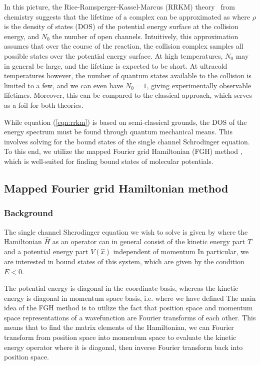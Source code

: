 \documentclass[%
 reprint,
 amsmath,amssymb,
 aps,
 nofootinbib
]{revtex4-1}
\begin{document}
In this picture, the Rice-Ramsperger-Kassel-Marcus (RRKM) theory~\cite{marcus1952-1,marcus1952-2} from chemistry suggests that the lifetime of a complex can be approximated as 
where $\rho$ is the density of states (DOS) of the potential energy surface at the collision energy, and $N_0$ the number of open channels. Intuitively, this approximation assumes that over the course of the reaction, the collision complex samples all possible states over the potential energy surface. At high temperatures, $N_0$ may in general be large, and the lifetime is expected to be short. At ultracold temperatures however, the number of quantum states available to the collision is limited to a few, and we can even have $N_0=1$, giving experimentally observable lifetimes. Moreover, this can be compared to the classical approach, which serves as a foil for both theories.

While equation (\ref{eqn:rrkm}) is based on semi-classical grounds, the DOS of the energy spectrum must be found through quantum mechanical means. This involves solving for the bound states of the single channel Schrodinger equation. To this end, we utilize the mapped Fourier grid Hamiltonian (FGH) method \cite{clay1989,fattal1996}, which is well-suited for finding bound states of molecular potentials.


\subsection{\label{sec:FGH}Mapped Fourier grid Hamiltonian method}

\subsubsection{\label{sec:FGH-background}Background}

The single channel Shcrodinger equation we wish to solve is given by
where the Hamiltonian $\hat{H}$ as an operator can in general consist of the kinetic energy part $\hat{T}$ and a potential energy part $V(\hat{x})$ independent of momentum
In particular, we are interested in bound states of this system, which are given by the condition $E<0$.

The potential energy is diagonal in the coordinate basis, whereas the kinetic energy is diagonal in momentum space basis, i.e.
where we have defined
The main idea of the FGH method is to utilize the fact that position space and momentum space representations of a wavefunction are Fourier transforms of each other. This means that to find the matrix elements of the Hamiltonian, we can Fourier transform from position space into momentum space to evaluate the kinetic energy operator where it is diagonal, then inverse Fourier transform back into position space.
\end{document}

